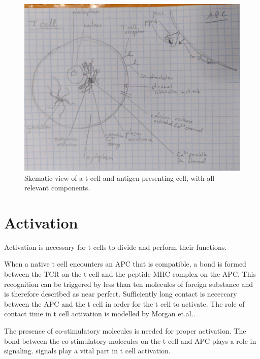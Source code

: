 \begin{figure}
	\centering
	\includegraphics[width=0.7\linewidth]{fig/tmp_t_cell_components}
	\caption{Skematic view of a t cell and antigen presenting cell, with all relevant components.}
	\label{fig:tcellcomponents}
\end{figure}

\section{Activation}

Activation is necessary for t cells to divide and perform their functions.\cite{Ganong1997}

When a native t cell encounters an APC that is compatible, a bond is formed between the TCR on the t cell and the peptide-MHC complex on the APC. This recognition can be triggered by less than ten molecules of foreign substance and is therefore described as near perfect. Sufficiently long contact is nececcary between the APC and the t cell in order for the t cell to activate. The role of contact time in t cell activation is modelled by Morgan et.al.\cite{morgan2023}.

The presence of co-stimulatory molecules is needed for proper activation. The bond between the co-stimulatory molecules on the t cell and APC plays a role in signaling. \Calcium signals play a vital part in t cell activation.

